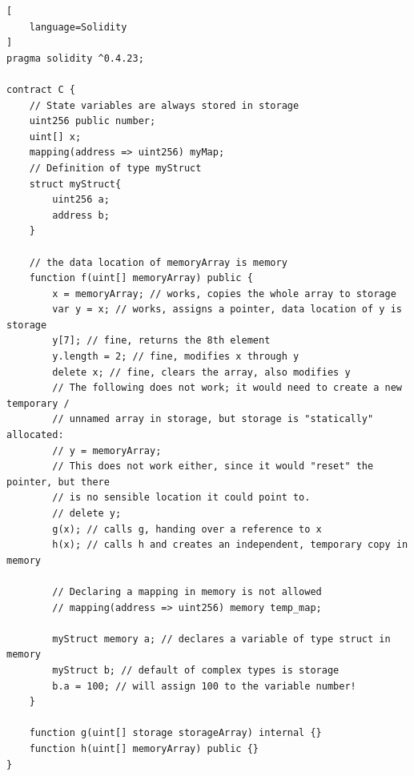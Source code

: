 \documentclass[a4paper]{article}
\begin{document}
\begin{lstlisting}[
    language=Solidity
]
pragma solidity ^0.4.23;

contract C {
    // State variables are always stored in storage
    uint256 public number;
    uint[] x; 
    mapping(address => uint256) myMap;
    // Definition of type myStruct
    struct myStruct{
        uint256 a;
        address b;
    }

    // the data location of memoryArray is memory
    function f(uint[] memoryArray) public {
        x = memoryArray; // works, copies the whole array to storage
        var y = x; // works, assigns a pointer, data location of y is storage
        y[7]; // fine, returns the 8th element
        y.length = 2; // fine, modifies x through y
        delete x; // fine, clears the array, also modifies y
        // The following does not work; it would need to create a new temporary /
        // unnamed array in storage, but storage is "statically" allocated:
        // y = memoryArray;
        // This does not work either, since it would "reset" the pointer, but there
        // is no sensible location it could point to.
        // delete y;
        g(x); // calls g, handing over a reference to x
        h(x); // calls h and creates an independent, temporary copy in memory
        
        // Declaring a mapping in memory is not allowed
        // mapping(address => uint256) memory temp_map;
        
        myStruct memory a; // declares a variable of type struct in memory
        myStruct b; // default of complex types is storage
        b.a = 100; // will assign 100 to the variable number!
    }

    function g(uint[] storage storageArray) internal {}
    function h(uint[] memoryArray) public {}
}
\end{lstlisting}
\end{document}
